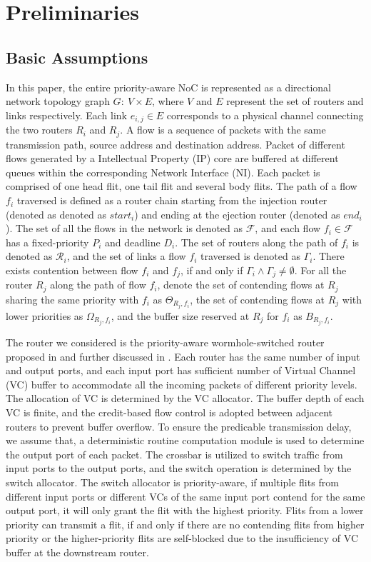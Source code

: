 \documentclass[preprint]{elsarticle}
\begin{document}
\section{Preliminaries}\label{model}
\subsection{Basic Assumptions}
In this paper, the entire priority-aware NoC is represented as a directional network topology graph $G:\ V\times E$, where $V$ and $E$ represent the set of routers and links respectively. Each link $e_{i,j}\in E$ corresponds to a physical channel connecting the two routers $R_i$ and $R_j$. A flow is a sequence of packets with the same transmission path, source address and destination address. Packet of different flows generated by a Intellectual Property (IP) core are buffered at different queues within the corresponding Network Interface (NI). Each packet is comprised of one head flit, one tail flit and several body flits. The path of a flow $f_i$ traversed is defined as a router chain starting from the injection router (denoted as denoted as $start_i$) and ending at the ejection router (denoted as $end_i$). The set of all the flows in the network is denoted as $\mathcal{F}$, and each flow $f_i\in\mathcal{F}$ has a fixed-priority $P_i$ and deadline $D_i$. The set of routers along the path of $f_i$ is denoted as $\mathcal{R}_i$, and the set of links a flow $f_i$ traversed is denoted as $\Gamma_i$. There exists contention between flow $f_i$ and $f_j$, if and only if $\Gamma_i\wedge\Gamma_j\neq\emptyset$. For all the router $R_j$ along the path of flow $f_i$, denote the set of contending flows at $R_j$ sharing the same priority with $f_i$ as $\Theta_{R_j,f_i}$, the set of contending flows at $R_j$ with lower priorities as $\Omega_{R_j,f_i}$, and the buffer size reserved at $R_j$ for $f_i$ as $B_{R_j,f_i}$.

The router we considered is the priority-aware wormhole-switched router proposed in \cite{Shi:2008:RCA:1397757.1397996} and further discussed in \cite{627905}\cite{707545}\cite{73}. Each router has the same number of input and output ports, and each input port has sufficient number of Virtual Channel (VC) buffer to accommodate all the incoming packets of different priority levels. The allocation of VC is determined by the VC allocator. The buffer depth of each VC is finite, and the credit-based flow control \cite{DaTo04} is adopted between adjacent routers to prevent buffer overflow. To ensure the predicable transmission delay, we assume that, a deterministic routine computation module is used to determine the output port of each packet. The crossbar is utilized to switch traffic from input ports to the output ports, and the switch operation is determined by the switch allocator. The switch allocator is priority-aware, if multiple flits from different input ports or different VCs of the same input port contend for the same output port, it will only grant the flit with the highest priority. Flits from a lower priority can transmit a flit, if and only if there are no contending flits from higher priority or the higher-priority flits are self-blocked due to the insufficiency of VC buffer at the downstream router.
\end{document}
